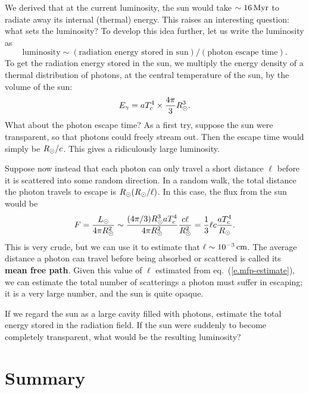We derived that at the current luminosity, the sun would take $\sim 16\,\mathrm{M}\mathrm{yr}$ to radiate away its internal (thermal) energy.  This raises an interesting question: what sets the luminosity?  To develop this idea further, let us write the luminosity as 
\[ \textrm{luminosity} \sim (\textrm{radiation energy stored in sun})/(\textrm{photon escape time}). \]
To get the radiation energy stored in the sun, we multiply the energy density of a thermal distribution of photons, at the central temperature of the sun, by the volume of the sun:
\begin{equation}\label{e.photon-energy-of-sun}
E_{\gamma} = aT_{c}^{4} \times \frac{4\pi}{3}R_{\odot}^{3}.
\end{equation}
What about the photon escape time? As a first try, suppose the sun were transparent, so that photons could freely stream out. Then the escape time would simply be $R_{\odot}/c$. This gives a ridiculously large luminosity.

Suppose now instead that each photon can only travel a short distance $\ell$ before it is scattered into some random direction.  In a random walk, the total distance the photon travels to escape is $R_{\odot}(R_{\odot}/\ell)$.  In this case, the flux from the sun would be
\begin{equation}\label{e.mfp-estimate}
F = \frac{L_{\odot}}{4\pi R_{\odot}^{2}} \sim \frac{(4\pi/3)R_{\odot}^{3} aT_{c}^{4}}{4\pi R_{\odot}^{2}} \frac{c\ell}{R_{\odot}^{2}} = \frac{1}{3} \ell c \frac{aT_{c}^{4}}{R_{\odot}}.
\end{equation}
This is very crude, but we can use it to estimate that $\ell \sim 10^{-3}\,\mathrm{c}\mathrm{m}$.  The average distance a photon can travel before being absorbed or scattered is called its \textbf{mean free path}.  Given this value of $\ell$ estimated from eq.~(\ref{e.mfp-estimate}), we can estimate the total number of scatterings a photon must suffer in escaping; it is a very large number, and the sun is quite opaque.

\begin{exercisebox}
If we regard the sun as a large cavity filled with photons, estimate the total energy stored in the radiation field.  If the sun were suddenly to become completely transparent, what would be the resulting luminosity?
\end{exercisebox}

\section{Summary}

